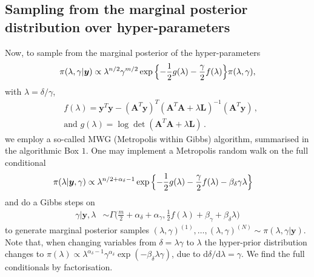 \subsection{Sampling from the marginal posterior distribution over hyper-parameters}
Now, to sample from the marginal posterior of the hyper-parameters
\begin{align}
	\pi(\lambda, \gamma | \bm{y})
	\propto  \lambda^{n/2} \gamma^{m/2}   \exp{ \Bigl\{ - \frac{1}{2} g ( \lambda) - \frac{\gamma}{2} f ( \lambda) \Bigr\} } \pi(\lambda, \gamma),
	\label{eq:MargPostAppl}
\end{align}
with $\lambda = \delta / \gamma$,
\begin{subequations}
	\label{eq:fandg}
	\begin{align}
		&f ( \lambda) = \bm{y}^T \bm{y} - (\bm{A}^T \bm{y})^T (\bm{A}^T  \bm{A} + \lambda \bm{L})^{-1} (\bm{A}^T \bm{y})  \, ,  \\
		&\text{and } g(\lambda) = \log \det (\bm{A}^T  \bm{A} + \lambda \bm{L}) \,.
	\end{align}
\end{subequations}
we employ a so-called MWG (Metropolis within Gibbs) algorithm, summarised in the algorithmic Box $1$.
One may implement a Metropolis random walk on the full conditional
\begin{align}
	\label{eq:lamCondPrior}
	\pi(\lambda | \bm{y}, \gamma) &\propto \lambda^{n/2+\alpha_\delta -1} \exp{\Bigl\{ - \frac{1}{2} g ( \lambda) - \frac{\gamma}{2} f ( \lambda) - \beta_\delta \gamma \lambda \Bigr\}} 
\end{align} 
and do a Gibbs steps on
\begin{align}
	\gamma |  \bm{y}, \lambda &\sim \Gamma \bigg( \frac{m}{2} + \alpha_\delta + \alpha_\gamma, \frac{1}{2} f (\lambda ) + \beta_\gamma + \beta_\delta \lambda \bigg)\label{eq:gamCondPrior}
\end{align} 
to generate marginal posterior samples $(\lambda, \gamma)^{(1)}, \dots, (\lambda, \gamma)^{(N)} \sim  \pi(\lambda, \gamma| \bm{y})$.
Note that, when changing variables from $\delta = \lambda \gamma$ to $\lambda$ the hyper-prior distribution changes to $\pi(\lambda) \propto \lambda^{\alpha_\delta-1} \gamma^{\alpha_\delta} \exp{(- \beta_\delta \lambda  \gamma)} $, due to $\text{d}\delta / \text{d} \lambda = \gamma$.
We find the full conditionals by factorisation.



